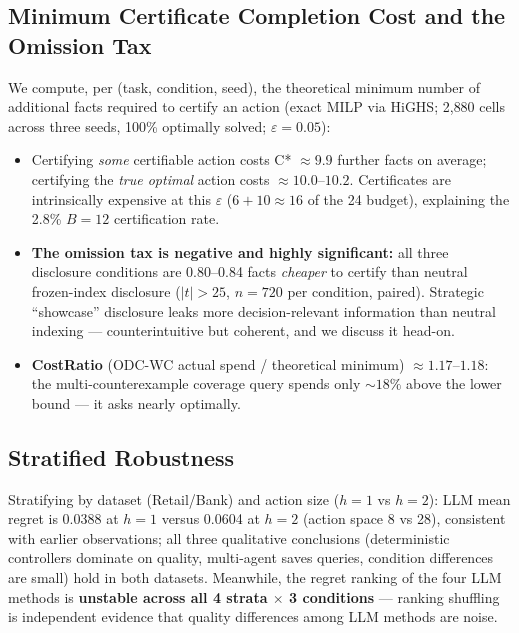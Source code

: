 \documentclass[letterpaper]{article}
\begin{document}
\subsection{Minimum Certificate Completion Cost and the Omission Tax}
We compute, per (task, condition, seed), the theoretical minimum number of additional facts required to certify an action (exact MILP via HiGHS; 2{,}880 cells across three seeds, 100\% optimally solved; $\varepsilon{=}0.05$):
\begin{itemize}
\item Certifying \emph{some} certifiable action costs C* ${\approx}9.9$ further facts on average; certifying the \emph{true optimal} action costs ${\approx}10.0$--$10.2$. Certificates are intrinsically expensive at this $\varepsilon$ ($6+10\approx16$ of the 24 budget), explaining the 2.8\% $B{=}12$ certification rate.
\item \textbf{The omission tax is negative and highly significant:} all three disclosure conditions are 0.80--0.84 facts \emph{cheaper} to certify than neutral frozen-index disclosure ($|t|>25$, $n{=}720$ per condition, paired). Strategic ``showcase'' disclosure leaks more decision-relevant information than neutral indexing --- counterintuitive but coherent, and we discuss it head-on.
\item \textbf{CostRatio} (ODC-WC actual spend / theoretical minimum) ${\approx}1.17$--$1.18$: the multi-counterexample coverage query spends only ${\sim}18\%$ above the lower bound --- it asks nearly optimally.
\end{itemize}

\subsection{Stratified Robustness}
Stratifying by dataset (Retail/Bank) and action size ($h{=}1$ vs $h{=}2$): LLM mean regret is 0.0388 at $h{=}1$ versus 0.0604 at $h{=}2$ (action space 8 vs 28), consistent with earlier observations; all three qualitative conclusions (deterministic controllers dominate on quality, multi-agent saves queries, condition differences are small) hold in both datasets. Meanwhile, the regret ranking of the four LLM methods is \textbf{unstable across all 4 strata $\times$ 3 conditions} --- ranking shuffling is independent evidence that quality differences among LLM methods are noise.
\end{document}
